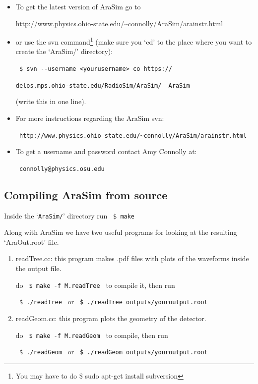 \documentclass[a4paper,10pt]{article}
\newcommand{\arasim}{AraSim\xspace}
\begin{document}
\begin{itemize}

\item To get the latest version of \arasim go to 

\url{http://www.physics.ohio-state.edu/~connolly/AraSim/arainstr.html}

\item or use the svn command\footnote{You may have to do \$ sudo apt-get install subversion} (make sure you `cd' to the place where you want to create the `AraSim/' directory): 

\verb| $ svn --username <yourusername> co https://|

\verb|delos.mps.ohio-state.edu/RadioSim/AraSim/  AraSim | 

(write this in one line). 

\item For more instructions regarding the \arasim svn:

\verb| http://www.physics.ohio-state.edu/~connolly/AraSim/arainstr.html |

\item To get a username and password contact Amy Connolly at: 

\verb| connolly@physics.osu.edu | 

\end{itemize}
 \vspace{-0.3cm}
\subsection{Compiling AraSim from source}

Inside the `\verb|AraSim/|' directory run \verb| $ make | 


Along with \arasim we have two useful programs for looking at the resulting `AraOut.root' file. 

\begin{enumerate} 

 \item readTree.cc: this program makes .pdf files with plots of the waveforms inside the output file. 
 
 do \verb| $ make -f M.readTree | to compile it, then run 
 
 \verb| $ ./readTree | or \verb| $ ./readTree outputs/youroutput.root |
 
 \item readGeom.cc: this program plots the geometry of the detector. 
 
 do \verb| $ make -f M.readGeom | to compile, then run
 
 \verb| $ ./readGeom | or \verb| $ ./readGeom outputs/youroutput.root |
 
\end{enumerate}
 \vspace{-0.3cm}
\end{document}

